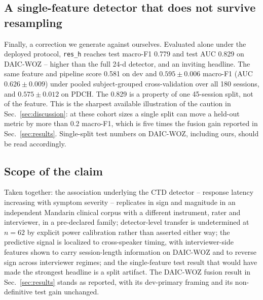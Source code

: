 \documentclass{article}
\begin{document}
\subsection{A single-feature detector that does not survive resampling}
\label{sec:audit-correction}
Finally, a correction we generate against ourselves. Evaluated alone under the deployed protocol, \texttt{res\_h} reaches test macro-F1 0.779 and test AUC 0.829 on DAIC-WOZ -- higher than the full 24-d detector, and an inviting headline. The same feature and pipeline score 0.581 on dev and $0.595 \pm 0.006$ macro-F1 (AUC $0.626 \pm 0.009$) under pooled subject-grouped cross-validation over all 180 sessions, and $0.575 \pm 0.012$ on PDCH. The 0.829 is a property of one 45-session split, not of the feature. This is the sharpest available illustration of the caution in Sec.~\ref{sec:discussion}: at these cohort sizes a single split can move a held-out metric by more than 0.2 macro-F1, which is five times the fusion gain reported in Sec.~\ref{sec:results}. Single-split test numbers on DAIC-WOZ, including ours, should be read accordingly.

\subsection{Scope of the claim}
\label{sec:audit-claim}
Taken together: the association underlying the CTD detector -- response latency increasing with symptom severity -- replicates in sign and magnitude in an independent Mandarin clinical corpus with a different instrument, rater and interviewer, in a pre-declared family; detector-level transfer is undetermined at $n{=}62$ by explicit power calibration rather than asserted either way; the predictive signal is localized to cross-speaker timing, with interviewer-side features shown to carry session-length information on DAIC-WOZ and to reverse sign across interviewer regimes; and the single-feature test result that would have made the strongest headline is a split artifact. The DAIC-WOZ fusion result in Sec.~\ref{sec:results} stands as reported, with its dev-primary framing and its non-definitive test gain unchanged.
\end{document}
